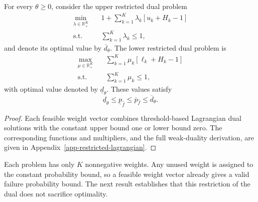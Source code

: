 \begin{lemma}
  \label{lem-weak-duality}
  For every $\theta\ge0$, consider the upper restricted dual problem
  \begin{equation}
    \begin{aligned}
      \min_{\lambda\in\mathbb R_+^K}\quad&
      1+\sum_{k=1}^K\lambda_k\left[u_k+H_k-1\right]\\
      \text{s.t.}\quad&\sum_{k=1}^K\lambda_k\le1,
    \end{aligned}
    \label{eq-upper-restricted-dual}
  \end{equation}
  and denote its optimal value by $\overline d_\theta$. The lower restricted dual problem is
  \begin{equation}
    \begin{aligned}
      \max_{\mu\in\mathbb R_+^K}\quad&
      \sum_{k=1}^K\mu_k\left[\ell_k+H_k-1\right]\\
      \text{s.t.}\quad&\sum_{k=1}^K\mu_k\le1,
    \end{aligned}
    \label{eq-lower-restricted-dual}
  \end{equation}
  with optimal value denoted by $\underline d_\theta$. These values satisfy
  \begin{equation}
    \underline d_\theta\le\underline p_{\hat f}\le\overline p_{\hat f}\le\overline d_\theta.
    \label{eq-weak-duality}
  \end{equation}
\end{lemma}
\begin{proof}
  Each feasible weight vector combines threshold-based Lagrangian dual solutions with the constant upper bound one or lower bound zero. The corresponding functions and multipliers, and the full weak-duality derivation, are given in Appendix~\ref{app-restricted-lagrangian}.
\end{proof}

Each problem has only $K$ nonnegative weights. Any unused weight is assigned to the constant probability bound, so a feasible weight vector already gives a valid failure probability bound. The next result establishes that this restriction of the dual does not sacrifice optimality.


